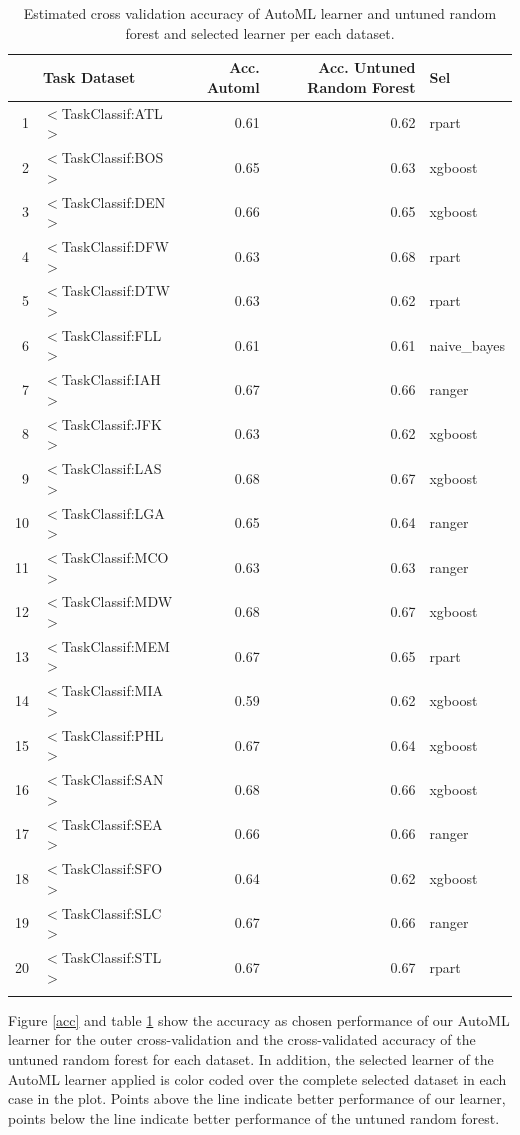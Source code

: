 \documentclass{article}
\begin{document}
\begin{table}[ht]
\centering
\begin{tabular}{rlrrl}
  \hline
 & Task Dataset & Acc. Automl & Acc. Untuned Random Forest & Sel \\ 
  \hline
  1 & $<$TaskClassif:ATL$>$ & 0.61 & 0.62 & rpart \\ 
  2 & $<$TaskClassif:BOS$>$ & 0.65 & 0.63 & xgboost \\ 
  3 & $<$TaskClassif:DEN$>$ & 0.66 & 0.65 & xgboost \\ 
  4 & $<$TaskClassif:DFW$>$ & 0.63 & 0.68 & rpart \\ 
  5 & $<$TaskClassif:DTW$>$ & 0.63 & 0.62 & rpart \\ 
  6 & $<$TaskClassif:FLL$>$ & 0.61 & 0.61 & naive\_bayes \\ 
  7 & $<$TaskClassif:IAH$>$ & 0.67 & 0.66 & ranger \\ 
  8 & $<$TaskClassif:JFK$>$ & 0.63 & 0.62 & xgboost \\ 
  9 & $<$TaskClassif:LAS$>$ & 0.68 & 0.67 & xgboost \\ 
  10 & $<$TaskClassif:LGA$>$ & 0.65 & 0.64 & ranger \\ 
  11 & $<$TaskClassif:MCO$>$ & 0.63 & 0.63 & ranger \\ 
  12 & $<$TaskClassif:MDW$>$ & 0.68 & 0.67 & xgboost \\ 
  13 & $<$TaskClassif:MEM$>$ & 0.67 & 0.65 & rpart \\ 
  14 & $<$TaskClassif:MIA$>$ & 0.59 & 0.62 & xgboost \\ 
  15 & $<$TaskClassif:PHL$>$ & 0.67 & 0.64 & xgboost \\ 
  16 & $<$TaskClassif:SAN$>$ & 0.68 & 0.66 & xgboost \\ 
  17 & $<$TaskClassif:SEA$>$ & 0.66 & 0.66 & ranger \\ 
  18 & $<$TaskClassif:SFO$>$ & 0.64 & 0.62 & xgboost \\ 
  19 & $<$TaskClassif:SLC$>$ & 0.67 & 0.66 & ranger \\ 
  20 & $<$TaskClassif:STL$>$ & 0.67 & 0.67 & rpart \\ 
   \hline
   \label{acc_table}
   \caption{Estimated cross validation accuracy of AutoML learner and untuned random forest and selected learner per each dataset.}
\end{tabular}
\end{table}

Figure \ref{acc} and table \ref{acc_table} show the accuracy as chosen performance of our AutoML learner for the outer cross-validation and the cross-validated accuracy of the untuned random forest for each dataset. In addition, the selected learner of the AutoML learner applied is color coded over the complete selected dataset in each case in the plot. Points above the line indicate better performance of our learner, points below the line indicate better performance of the untuned random forest.
\end{document}
